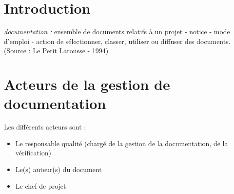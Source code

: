 \documentclass{mise_en_page}
\begin{document}
\maketitle

\begin{historique}
\end{historique}

\newpage

\tableofcontents

\section{Introduction}

\emph{documentation :} ensemble de documents relatifs à un projet - notice -
mode d’emploi - action de sélectionner, classer, utiliser ou diffuser
des documents. (Source : Le Petit Larousse - 1994)

\section{Acteurs de la
gestion de documentation}

Les différents acteurs sont :

\begin{itemize}
\item Le responsable qualité (chargé de la gestion de la documentation,
de la vérification)
\item Le(s) auteur(s) du document
\item Le chef de projet
\end{itemize}
\end{document}
